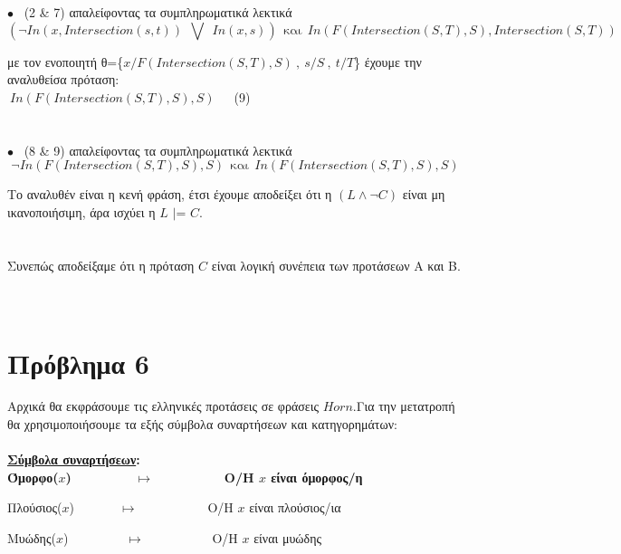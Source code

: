 \documentclass[10pt]{article}
\begin{document}
$\bullet$ \ (2 \&  7) απαλείφοντας τα συμπληρωματικά λεκτικά  \\
\[
\left( \neg In( x, Intersection(s,t)) \ \ \bigvee \ \  In(x,s) \right) \ \ \text{και} \ \ In(F(Intersection(S,T),S),Intersection(S,T)) 
\] 

\hspace{5mm} με τον ενοποιητή θ=\{$x/F(Intersection(S,T),S) \ , \ s/S \ , \ t/T$\} έχουμε την αναλυθείσα πρόταση: \\

\hspace{60mm} $\ In(F(Intersection(S,T),S),S)$\ \ \  (9) \\ \\  \\

$\bullet$ \ (8 \&  9) απαλείφοντας τα συμπληρωματικά λεκτικά  \\
\[
\neg In(F(Intersection(S,T),S),S) \ \ \text{και} \ \  In(F(Intersection(S,T),S),S) 
\] 

\hspace{1mm} Το αναλυθέν είναι η κενή φράση, έτσι έχουμε αποδείξει ότι η $( L \wedge \neg C ) $ είναι μη ικανοποιήσιμη, άρα ισχύει  η $L$ $|$= $C$. \\ \\  \\
Συνεπώς αποδείξαμε ότι η πρόταση $C$ είναι λογική συνέπεια των προτάσεων Α και Β. \\ \\ \\
\section*{Πρόβλημα 6}
\vspace{5mm}
Αρχικά θα εκφράσουμε τις ελληνικές προτάσεις σε φράσεις $Horn$.Για την μετατροπή θα χρησιμοποιήσουμε τα εξής σύμβολα συναρτήσεων και κατηγορημάτων: \\ \\

\bf \underline{Σύμβολα συναρτήσεων}: \normalfont \\

\hspace{5mm}Όμορφο($x$) \ \ \ \ \ \ \ \ $\mapsto$ \ \ \ \ \ \ \ \ \ Ο/Η $x$ είναι όμορφος/η 


\hspace{5mm}Πλούσιος($x$)\ \ \ \ \ \ \ $\mapsto$\ \ \ \ \ \ \ \ \ \ \ Ο/Η $x$ είναι πλούσιος/ια 

\hspace{5mm}Μυώδης($x$)\ \ \ \ \ \ \ \ \ $\mapsto$ \ \ \ \ \ \ \ \ \ \ Ο/Η $x$ είναι μυώδης
\end{document}

